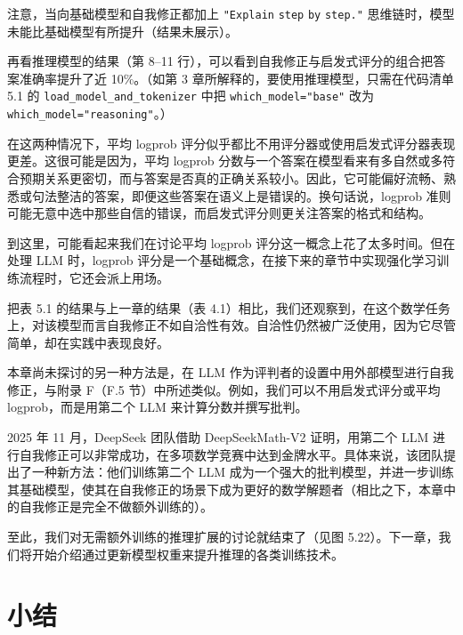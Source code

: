 注意，当向基础模型和自我修正都加上 \texttt{"}\texttt{Explain} \texttt{step} \texttt{by} \texttt{step.}\texttt{"} 思维链时，模型未能比基础模型有所提升（结果未展示）。

再看推理模型的结果（第 8–11 行），可以看到自我修正与启发式评分的组合把答案准确率提升了近 10\%。（如第 3 章所解释的，要使用推理模型，只需在代码清单 5.1 的 \texttt{load\_model\_and\_tokenizer} 中把 \texttt{which\_model=}\texttt{"}\texttt{base}\texttt{"} 改为 \texttt{which\_model=}\texttt{"}\texttt{reasoning}\texttt{"}。）

在这两种情况下，平均 logprob 评分似乎都比不用评分器或使用启发式评分器表现更差。这很可能是因为，平均 logprob 分数与一个答案在模型看来有多自然或多符合预期关系更密切，而与答案是否真的正确关系较小。因此，它可能偏好流畅、熟悉或句法整洁的答案，即便这些答案在语义上是错误的。换句话说，logprob 准则可能无意中选中那些自信的错误，而启发式评分则更关注答案的格式和结构。

到这里，可能看起来我们在讨论平均 logprob 评分这一概念上花了太多时间。但在处理 LLM 时，logprob 评分是一个基础概念，在接下来的章节中实现强化学习训练流程时，它还会派上用场。

把表 5.1 的结果与上一章的结果（表 4.1）相比，我们还观察到，在这个数学任务上，对该模型而言自我修正不如自洽性有效。自洽性仍然被广泛使用，因为它尽管简单，却在实践中表现良好。

本章尚未探讨的另一种方法是，在 LLM 作为评判者的设置中用外部模型进行自我修正，与附录 F（F.5 节）中所述类似。例如，我们可以不用启发式评分或平均 logprob，而是用第二个 LLM 来计算分数并撰写批判。

2025 年 11 月，DeepSeek 团队借助 DeepSeekMath-V2 证明，用第二个 LLM 进行自我修正可以非常成功，在多项数学竞赛中达到金牌水平。具体来说，该团队提出了一种新方法：他们训练第二个 LLM 成为一个强大的批判模型，并进一步训练其基础模型，使其在自我修正的场景下成为更好的数学解题者（相比之下，本章中的自我修正是完全不做额外训练的）。

至此，我们对无需额外训练的推理扩展的讨论就结束了（见图 5.22）。下一章，我们将开始介绍通过更新模型权重来提升推理的各类训练技术。


\section{小结}

